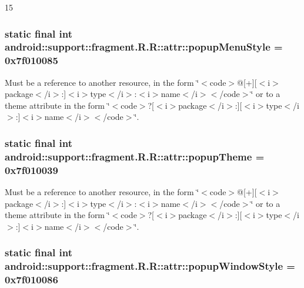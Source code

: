 15\hypertarget{classandroid_1_1support_1_1fragment_1_1_r_1_1attr_3f6e2b9347d2a99889b420f1d99af945}{
\subsubsection[{popupMenuStyle}]{\setlength{\rightskip}{0pt plus 5cm}static final int android::support::fragment.R.R::attr::popupMenuStyle = 0x7f010085}}
\label{classandroid_1_1support_1_1fragment_1_1_r_1_1attr_3f6e2b9347d2a99889b420f1d99af945}


Must be a reference to another resource, in the form \char`\"{}$<$code$>$@\mbox{[}+\mbox{]}\mbox{[}$<$i$>$package$<$/i$>$:\mbox{]}$<$i$>$type$<$/i$>$:$<$i$>$name$<$/i$>$$<$/code$>$\char`\"{} or to a theme attribute in the form \char`\"{}$<$code$>$?\mbox{[}$<$i$>$package$<$/i$>$:\mbox{]}\mbox{[}$<$i$>$type$<$/i$>$:\mbox{]}$<$i$>$name$<$/i$>$$<$/code$>$\char`\"{}. \hypertarget{classandroid_1_1support_1_1fragment_1_1_r_1_1attr_7c04e11e5c4a7d8b444f1949c14cc6ff}{
\subsubsection[{popupTheme}]{\setlength{\rightskip}{0pt plus 5cm}static final int android::support::fragment.R.R::attr::popupTheme = 0x7f010039}}
\label{classandroid_1_1support_1_1fragment_1_1_r_1_1attr_7c04e11e5c4a7d8b444f1949c14cc6ff}


Must be a reference to another resource, in the form \char`\"{}$<$code$>$@\mbox{[}+\mbox{]}\mbox{[}$<$i$>$package$<$/i$>$:\mbox{]}$<$i$>$type$<$/i$>$:$<$i$>$name$<$/i$>$$<$/code$>$\char`\"{} or to a theme attribute in the form \char`\"{}$<$code$>$?\mbox{[}$<$i$>$package$<$/i$>$:\mbox{]}\mbox{[}$<$i$>$type$<$/i$>$:\mbox{]}$<$i$>$name$<$/i$>$$<$/code$>$\char`\"{}. \hypertarget{classandroid_1_1support_1_1fragment_1_1_r_1_1attr_d9b078b5f08fa8ea59804b56725c1ddc}{
\subsubsection[{popupWindowStyle}]{\setlength{\rightskip}{0pt plus 5cm}static final int android::support::fragment.R.R::attr::popupWindowStyle = 0x7f010086}}
\label{classandroid_1_1support_1_1fragment_1_1_r_1_1attr_d9b078b5f08fa8ea59804b56725c1ddc}


